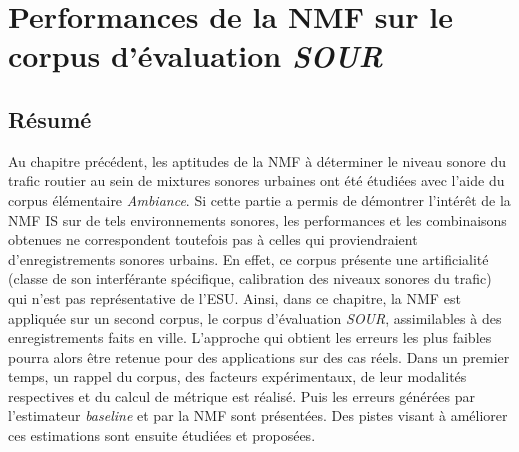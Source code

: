 
\chapter{Performances de la NMF sur le corpus d'évaluation \textit{SOUR}}
\label{chap:grafic}


\section*{\centering Résumé}



\vspace{2cm}

Au chapitre précédent, les aptitudes de la NMF à déterminer le niveau sonore du trafic routier au sein de mixtures sonores urbaines ont été étudiées avec l'aide du corpus élémentaire \textit{Ambiance}. Si cette partie a permis de démontrer l'intérêt de la NMF IS sur de tels environnements sonores, les performances et les combinaisons obtenues ne correspondent toutefois pas à celles qui proviendraient d'enregistrements sonores urbains. En effet, ce corpus présente une artificialité (classe de son interférante spécifique, calibration des niveaux sonores du trafic) qui n'est pas représentative de l'ESU. Ainsi, dans ce chapitre, la NMF est appliquée sur un second corpus, le corpus d'évaluation \textit{SOUR}, assimilables à des enregistrements faits en ville. L'approche qui obtient les erreurs les plus faibles pourra alors être retenue pour des applications sur des cas réels. Dans un premier temps, un rappel du corpus, des facteurs expérimentaux, de leur modalités respectives et du calcul de métrique est réalisé. Puis les erreurs générées par l'estimateur \textit{baseline} et par la NMF sont présentées. Des pistes visant à améliorer ces estimations sont ensuite étudiées et proposées.


